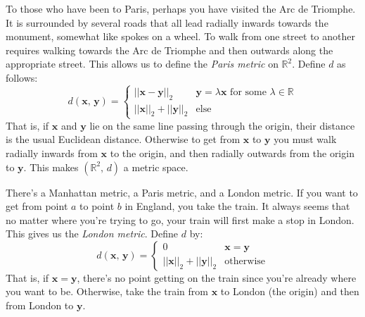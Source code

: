 \documentclass{article}
\theoremstyle{plain}
\theoremstyle{normal}
\newenvironment{example}{%
    \pushQED{\qed}\renewcommand{\qedsymbol}{$\blacksquare$}\examplex%
}{%
    \popQED\endexamplex%
}
\begin{document}
        \begin{example}
            To those who have been to Paris, perhaps you have visited the
            Arc de Triomphe. It is surrounded by several roads that all lead
            radially inwards towards the monument, somewhat like spokes on
            a wheel. To walk from one street to another requires walking towards
            the Arc de Triomphe and then outwards along the appropriate street.
            This allows us to define the \textit{Paris metric} on
            $\mathbb{R}^{2}$. Define $d$ as follows:
            \begin{equation}
                d(\mathbf{x},\,\mathbf{y})=
                \begin{cases}
                    ||\mathbf{x}-\mathbf{y}||_{2}&
                        \mathbf{y}=\lambda\mathbf{x}\textrm{ for some }
                        \lambda\in\mathbb{R}\\
                    ||\mathbf{x}||_{2}+||\mathbf{y}||_{2}&
                        \textrm{else}
                \end{cases}
            \end{equation}
            That is, if $\mathbf{x}$ and $\mathbf{y}$ lie on the same line
            passing through the origin, their distance is the usual Euclidean
            distance. Otherwise to get from $\mathbf{x}$ to $\mathbf{y}$ you
            must walk radially inwards from $\mathbf{x}$ to the origin, and
            then radially outwards from the origin to $\mathbf{y}$. This makes
            $(\mathbb{R}^{2},\,d)$ a metric space.
        \end{example}
        \begin{example}
            There's a Manhattan metric, a Paris metric, and a London metric.
            If you want to get from point $a$ to point $b$ in England, you take
            the train. It always seems that no matter where you're trying to
            go, your train will first make a stop in London. This gives us the
            \textit{London metric}. Define $d$ by:
            \begin{equation}
                d(\mathbf{x},\,\mathbf{y})=
                \begin{cases}
                    0&\mathbf{x}=\mathbf{y}\\
                    ||\mathbf{x}||_{2}+||\mathbf{y}||_{2}&\textrm{otherwise}
                \end{cases}
            \end{equation}
            That is, if $\mathbf{x}=\mathbf{y}$, there's no point getting on
            the train since you're already where you want to be. Otherwise,
            take the train from $\mathbf{x}$ to London (the origin) and then
            from London to $\mathbf{y}$.
        \end{example}
\end{document}
